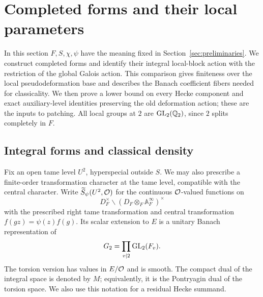 \section{Completed forms and their local parameters}\label{sec:completed}

In this section \(F,S,\chi,\psi\) have the meaning fixed in
Section~\ref{sec:preliminaries}. We construct completed forms and
identify their integral local-block action with the restriction of
the global Galois action. This comparison gives finiteness over the
local pseudodeformation base and describes the Banach coefficient
fibers needed for classicality. We then prove a lower bound on every
Hecke component and exact auxiliary-level identities preserving the
old deformation action; these are the inputs to patching. All local
groups at \(2\)
are \(\operatorname{GL}_2(\mathbb Q_2)\), since \(2\) splits completely in \(F\).

\subsection{Integral forms and classical density}

Fix an open tame level \(U^2\), hyperspecial outside \(S\).
We may also prescribe a finite-order transformation character
at the tame level, compatible with the central character.
Write \(\widetilde S_\psi(U^2,\mathcal O)\) for the continuous
\(\mathcal O\)-valued functions on
\[
 D_F^\times\backslash(D_F\otimes_F\mathbb A_F^\infty)^\times
\]
with the prescribed right tame transformation and central
transformation \(f(gz)=\psi(z)f(g)\). Its scalar extension to
\(E\) is a unitary Banach representation of
\[
 G_2=\prod_{v\mid2}\operatorname{GL}_2(F_v).
\]
The torsion version has values in \(E/\mathcal O\) and is smooth.
The compact dual of the integral space is denoted by \(M\);
equivalently, it is the Pontryagin dual of the torsion space.
We also use this notation for a residual Hecke summand.

